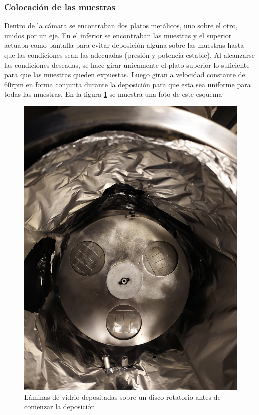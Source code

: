 \documentclass[12pt]{article}
\theoremstyle{definition}
\theoremstyle{remark}
\begin{document}
\subsubsection{Colocación de las muestras}
Dentro de la cámara se encontraban dos platos metálicos, uno sobre el otro, unidos por un eje. En el inferior se encontraban las muestras y el superior actuaba como pantalla para evitar deposición alguna sobre las muestras hasta que las condiciones sean las adecuadas (presión y potencia estable). Al alcanzarse las condiciones deseadas, se hace girar unicamente el plato superior lo suficiente para que las muestras queden expuestas. Luego giran a velocidad constante de 60rpm en forma conjunta durante la deposición para que esta sea uniforme para todas las muestras. En la figura \ref{muestras} se muestra una foto de este esquema

\begin{figure}[H]
	\centering
	\includegraphics[scale=0.1]{img/muestras.jpg}
	\caption{Láminas de vidrio depositadas sobre un disco rotatorio antes de comenzar la deposición}
	\label{muestras}
\end{figure}
\end{document}
